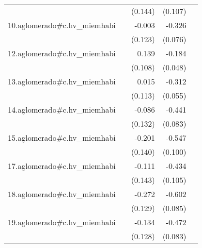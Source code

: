 {\begin{longtable}{l*{4}{D{.}{.}{-1}}}
            &                     &     (0.144)         &     (0.107)         &                     \\
\addlinespace
10.aglomerado#c.hv\_miemhabi&                     &      -0.003         &      -0.326\sym{***}&                     \\
            &                     &     (0.123)         &     (0.076)         &                     \\
\addlinespace
12.aglomerado#c.hv\_miemhabi&                     &       0.139         &      -0.184\sym{***}&                     \\
            &                     &     (0.108)         &     (0.048)         &                     \\
\addlinespace
13.aglomerado#c.hv\_miemhabi&                     &       0.015         &      -0.312\sym{***}&                     \\
            &                     &     (0.113)         &     (0.055)         &                     \\
\addlinespace
14.aglomerado#c.hv\_miemhabi&                     &      -0.086         &      -0.441\sym{***}&                     \\
            &                     &     (0.132)         &     (0.083)         &                     \\
\addlinespace
15.aglomerado#c.hv\_miemhabi&                     &      -0.201         &      -0.547\sym{***}&                     \\
            &                     &     (0.140)         &     (0.100)         &                     \\
\addlinespace
17.aglomerado#c.hv\_miemhabi&                     &      -0.111         &      -0.434\sym{***}&                     \\
            &                     &     (0.143)         &     (0.105)         &                     \\
\addlinespace
18.aglomerado#c.hv\_miemhabi&                     &      -0.272\sym{*}  &      -0.602\sym{***}&                     \\
            &                     &     (0.129)         &     (0.085)         &                     \\
\addlinespace
19.aglomerado#c.hv\_miemhabi&                     &      -0.134         &      -0.472\sym{***}&                     \\
            &                     &     (0.128)         &     (0.083)         &                     \\

\end{longtable}}
